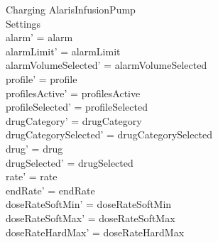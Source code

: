 \begin{schema}{Charging}
	\Delta AlarisInfusionPump\\
	Settings\\
	\where
	alarm' = alarm\\
	alarmLimit' = alarmLimit\\
	alarmVolumeSelected' = alarmVolumeSelected\\
	profile' = profile\\
	profilesActive' = profilesActive\\  
	  profileSelected' = profileSelected\\
	  
	drugCategory' = drugCategory\\ drugCategorySelected' = drugCategorySelected\\
	drug' = drug\\ drugSelected' = drugSelected\\
	rate' = rate\\
	endRate' = endRate\\
	doseRateSoftMin' = doseRateSoftMin\\
	doseRateSoftMax' = doseRateSoftMax\\
	doseRateHardMax' = doseRateHardMax\\
	 

\end{schema}
